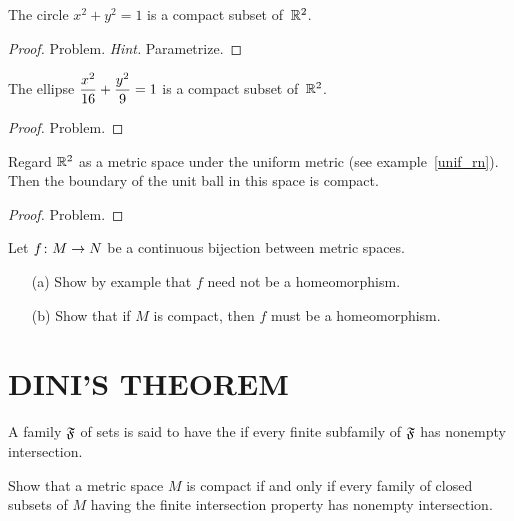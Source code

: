 \begin{exam} The circle $x^2 + y^2 = 1$ is a compact subset of~$\mathbb{R}^2$.
\end{exam}

\begin{proof} Problem. \emph{Hint.} Parametrize.  \ns \end{proof}

\begin{exam}\label{exam_ellipse_cpt} The ellipse $\displaystyle\frac{x^2}{16} + \frac{y^2}9 = 1$ is a compact subset of~$\mathbb{R}^2$.
\end{exam}

\begin{proof} Problem.  \ns  \end{proof}

\begin{exam} Regard $\mathbb{R}^2$ as a metric space under the uniform metric (see example~\ref{unif_rn}).
Then the boundary of the unit ball in this space is compact.
\end{exam}

\begin{proof} Problem.  \ns  \end{proof}

\begin{prob} Let $f \colon M \rightarrow N$ be a continuous bijection between metric spaces.
 \begin{enumerate}
  \item[(a)] Show by example that $f$ need not be a homeomorphism.
  \item[(b)] Show that if $M$ is compact, then $f$ must be a homeomorphism.
 \end{enumerate}
\end{prob}







\section{DINI'S THEOREM}
\begin{defn} A family $\mathfrak{F}$ of sets is said to have the
 if every finite subfamily of $\mathfrak{F}$ has nonempty
intersection.
\end{defn}

\begin{prob}\label{fip} Show that a metric space $M$ is compact if and only if every family
of closed subsets of $M$ having the finite intersection property has nonempty intersection.
\end{prob}

